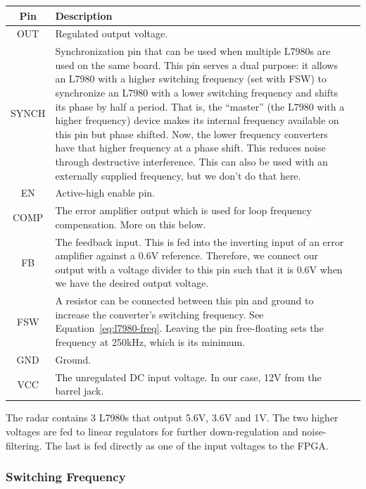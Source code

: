 \label{tab:l7980-pins}
\begin{tabularx}{\textwidth}{c X>{\raggedright\arraybackslash}X}
  \caption{L7980 pin connections.} \\
  \toprule
  \textbf{Pin} & \textbf{Description} \\
  \midrule
  \endhead

  OUT & Regulated output voltage. \\
  SYNCH & Synchronization pin that can be used when multiple L7980s are used on the same board. This
  pin serves a dual purpose: it allows an L7980 with a higher switching frequency (set with FSW) to
  synchronize an L7980 with a lower switching frequency and shifts its phase by half a period. That
  is, the ``master'' (the L7980 with a higher frequency) device makes its internal frequency
  available on this pin but phase shifted. Now, the lower frequency converters have that higher
  frequency at a phase shift. This reduces noise through destructive interference. This can also be
  used with an externally supplied frequency, but we don't do that here. \\
  EN & Active-high enable pin. \\
  COMP & The error amplifier output which is used for loop frequency compensation. More on this
  below. \\
  FB & The feedback input. This is fed into the inverting input of an error amplifier against a 0.6V
  reference. Therefore, we connect our output with a voltage divider to this pin such that it is
  0.6V when we have the desired output voltage. \\
  FSW & A resistor can be connected between this pin and ground to increase the converter's
  switching frequency. See Equation~\ref{eq:l7980-freq}. Leaving the pin free-floating sets the
  frequency at 250kHz, which is its minimum. \\
  GND & Ground. \\
  VCC & The unregulated DC input voltage. In our case, 12V from the barrel jack. \\

  \bottomrule
\end{tabularx}

The radar contains 3 L7980s that output 5.6V, 3.6V and 1V. The two higher voltages are fed to linear
regulators for further down-regulation and noise-filtering. The last is fed directly as one of the
input voltages to the FPGA.

\subsubsection{Switching Frequency}
\label{sec:l7980-switching-frequency}

